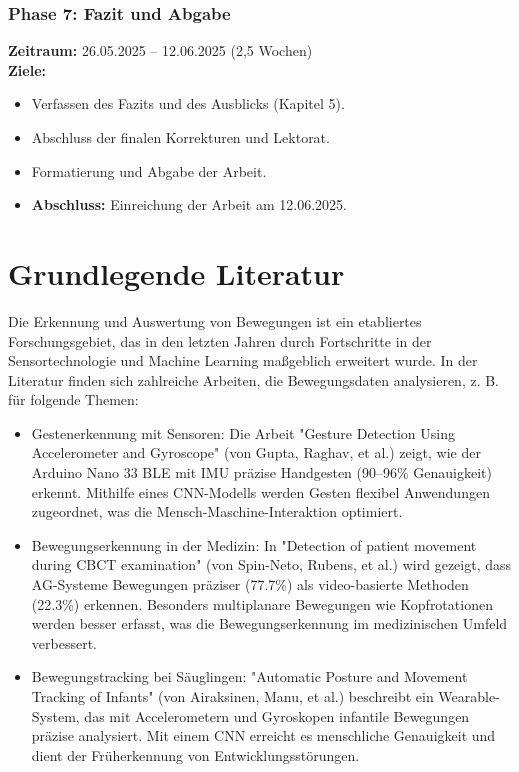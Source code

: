 \documentclass{scrartcl}
\begin{document}
\subsubsection*{Phase 7: Fazit und Abgabe}
\textbf{Zeitraum:} 26.05.2025 – 12.06.2025 (2,5 Wochen)  \\
\textbf{Ziele:}
\begin{itemize}
	\item Verfassen des Fazits und des Ausblicks (Kapitel 5).
	\item Abschluss der finalen Korrekturen und Lektorat.
	\item Formatierung und Abgabe der Arbeit.
	\item \textbf{Abschluss:} Einreichung der Arbeit am 12.06.2025.
\end{itemize}

\section{Grundlegende Literatur}
Die Erkennung und Auswertung von Bewegungen ist ein etabliertes Forschungsgebiet, das in den letzten Jahren durch Fortschritte in der Sensortechnologie und Machine Learning maßgeblich erweitert wurde. In der Literatur finden sich zahlreiche Arbeiten, die Bewegungsdaten analysieren, z. B. für folgende Themen:

\begin{itemize} 
	\item Gestenerkennung mit Sensoren: Die Arbeit "Gesture Detection Using Accelerometer and Gyroscope" (von Gupta, Raghav, et al.) zeigt, wie der Arduino Nano 33 BLE mit IMU präzise Handgesten (90–96\% Genauigkeit) erkennt. Mithilfe eines CNN-Modells werden Gesten flexibel Anwendungen zugeordnet, was die Mensch-Maschine-Interaktion optimiert.
	
	\item Bewegungserkennung in der Medizin: In "Detection of patient movement during CBCT examination" (von Spin-Neto, Rubens, et al.) wird gezeigt, dass AG-Systeme Bewegungen präziser (77.7\%) als video-basierte Methoden (22.3\%) erkennen. Besonders multiplanare Bewegungen wie Kopfrotationen werden besser erfasst, was die Bewegungserkennung im medizinischen Umfeld verbessert.
	
	\item Bewegungstracking bei Säuglingen: "Automatic Posture and Movement Tracking of Infants" (von Airaksinen, Manu, et al.) beschreibt ein Wearable-System, das mit Accelerometern und Gyroskopen infantile Bewegungen präzise analysiert. Mit einem CNN erreicht es menschliche Genauigkeit und dient der Früherkennung von Entwicklungsstörungen.
\end{itemize}
\end{document}
